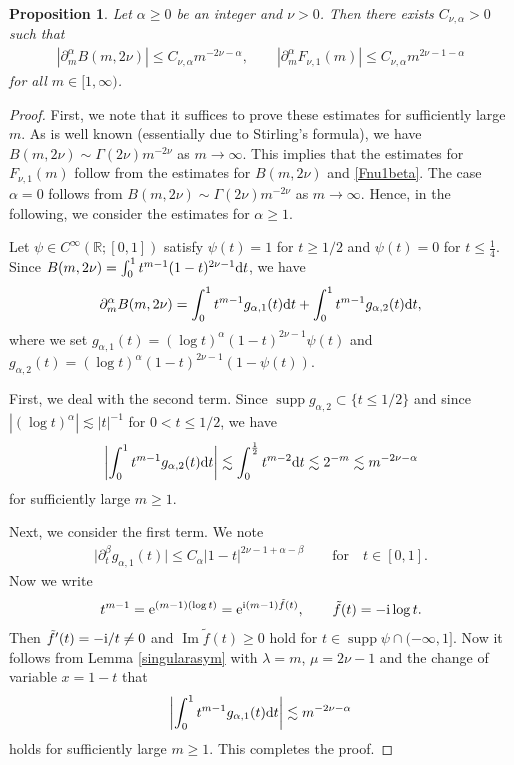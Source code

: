 \documentclass[pdftex]{sigma}
\numberwithin{equation}{section}
\newtheorem{Proposition}[Theorem]{Proposition}
 { \theoremstyle{definition}
\newtheorem{Definition}[Theorem]{Definition}
\newtheorem{Note}[Theorem]{Note}
\newtheorem{Example}[Theorem]{Example}
\newtheorem{Remark}[Theorem]{Remark} }
\def\R{\mathbb{R}}%
\DeclareMathOperator{\supp}{supp}%
\DeclareMathOperator{\im}{Im}%
\def\a{\alpha}
\def\b{\beta}
\def\g{\psi}
\def\l{\lambda}
\def\m{\mu}
\def\n{\nu}
\def\pa{\partial}
\begin{document}
\begin{Proposition}\label{Fnuestimate}
Let $\a\geq 0$ be an integer and $\n>0$. Then there exists $C_{\n,\a}>0$ such that
\begin{align*}
|\pa_m^{\a}B(m,2\n)|\leq C_{\n,\a}m^{-2\n-\a},\qquad |\pa_m^{\a}F_{\n,1}(m)|\leq C_{\n,\a}m^{2\n-1-\a}
\end{align*}
for all $m\in [1,\infty)$.
\end{Proposition}

\begin{proof}First, we note that it suffices to prove these estimates for sufficiently large $m$. As is well known (essentially due to Stirling's formula), we have $B(m,2\n)\sim \Gamma(2\n)m^{-2\n}$ as $m\to \infty$.
This implies that the estimates for $F_{\n,1}(m)$ follow from the estimates for $B(m,2\n)$ and \eqref{Fnu1beta}. The case $\a=0$ follows from $B(m,2\n)\sim \Gamma(2\n)m^{-2\n}$ as $m\to \infty$. Hence, in the following, we consider the estimates for $\a\geq 1$.

Let $\g\in C^{\infty}(\R;[0,1])$ satisfy $\g(t)=1$ for $t\geq 1/2$ and $\g(t)=0$ for $t\leq \frac{1}{4}$.
Since $B(m,2\n)=\int_0^1t^{m-1}(1-t)^{2\n-1}{\rm d}t$, we have
\begin{align*}
\pa_m^{\a}B(m,2\n)=\int_0^1t^{m-1}g_{\a,1}(t){\rm d}t+\int_0^1t^{m-1}g_{\a,2}(t){\rm d}t,
\end{align*}
where we set $g_{\a,1}(t)=(\log t)^{\a}(1-t)^{2\n-1}\g(t)$ and $g_{\a,2}(t)=(\log t)^{\a}(1-t)^{2\n-1}(1-\g(t))$.

First, we deal with the second term. Since $\supp g_{\a,2}\subset \{t\leq 1/2\}$ and since $|(\log t)^{\a}|\lesssim |t|^{-1}$ for $0<t\leq 1/2$, we have
\begin{align*}
\left|\int_0^1t^{m-1}g_{\a,2}(t){\rm d}t\right|\lesssim \int_0^{\frac{1}{2}}t^{m-2}{\rm d}t\lesssim 2^{-m}\lesssim m^{-2\n-\a}
\end{align*}
for sufficiently large $m\geq 1$.

Next, we consider the first term. We note
\begin{align*}
\big|\pa_{t}^{\b}g_{\a,1}(t)\big|\leq C_{\a}|1-t|^{2\n-1+\a-\b}\qquad\text{for}\quad t\in [0,1].
\end{align*}
Now we write
\begin{align*}
t^{m-1}={\rm e}^{(m-1)(\log t)}={\rm e}^{{\rm i}(m-1)\tilde{f}(t)},\qquad \tilde{f}(t)=-{\rm i}\log t.
\end{align*}
Then $\tilde{f}'(t)=-{\rm i}/t\neq 0$ and $\im \tilde{f}(t)\geq 0$ hold for $t\in \supp \g\cap (-\infty,1]$.
Now it follows from Lemma \ref{singularasym} with $\l=m$, $\m=2\n-1$ and the change of variable $x=1-t$ that
\begin{align*}
\left|\int_0^1t^{m-1}g_{\a,1}(t){\rm d}t\right|\lesssim m^{-2\n-\a}
\end{align*}
holds for sufficiently large $m\geq 1$. This completes the proof.
\end{proof}
\end{document}
